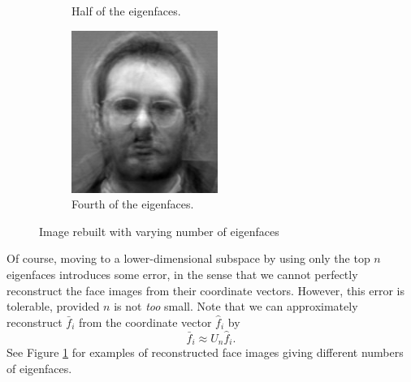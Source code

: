 \begin{figure}
\begin{subfigure}[b]{0.3\textwidth}
\caption{Half of the eigenfaces.}
\end{subfigure}
\begin{subfigure}[b]{0.3\textwidth}
\includegraphics[width=\textwidth]{rebuiltFourth.png}
\caption{Fourth of the eigenfaces.}
\end{subfigure}
\caption{Image rebuilt with varying number of eigenfaces}
\label{facialRecognition:rebuiltImage}
\end{figure}
Of course, moving to a lower-dimensional subspace by using only the top $n$ eigenfaces introduces some error, in the sense that we cannot perfectly
reconstruct the face images from their coordinate vectors.
However, this error is tolerable, provided $n$ is not \emph{too} small.
Note that we can approximately reconstruct $\bar{f}_i$ from the coordinate vector $\hat{f}_i$ by
\[
\bar{f}_i \approx U_n\hat{f}_i.
\]
See Figure \ref{facialRecognition:rebuiltImage} for examples of reconstructed face images giving different numbers of eigenfaces.

